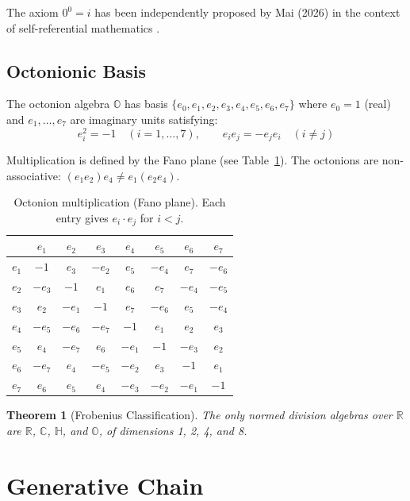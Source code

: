 \documentclass[11pt]{article}
\newtheorem{theorem}{Theorem}
\begin{document}
The axiom $0^0 = i$ has been independently proposed by Mai (2026) in the context of self-referential mathematics \cite{mai2026selfreferential}.

\subsection{Octonionic Basis}

The octonion algebra $\mathbb{O}$ has basis $\{e_0, e_1, e_2, e_3, e_4, e_5, e_6, e_7\}$ where $e_0 = 1$ (real) and $e_1, \ldots, e_7$ are imaginary units satisfying:
\begin{equation}
e_i^2 = -1 \quad (i = 1, \ldots, 7), \qquad e_i e_j = -e_j e_i \quad (i \neq j)
\end{equation}

Multiplication is defined by the Fano plane (see Table~\ref{tab:fano}). The octonions are non-associative: $(e_1 e_2) e_4 \neq e_1 (e_2 e_4)$.

\begin{table}[ht]
\centering
\caption{Octonion multiplication (Fano plane). Each entry gives $e_i \cdot e_j$ for $i < j$.}
\label{tab:fano}
\begin{tabular}{c|ccccccc}
\toprule
 & $e_1$ & $e_2$ & $e_3$ & $e_4$ & $e_5$ & $e_6$ & $e_7$ \\
\midrule
$e_1$ & $-1$ & $e_3$ & $-e_2$ & $e_5$ & $-e_4$ & $e_7$ & $-e_6$ \\
$e_2$ & $-e_3$ & $-1$ & $e_1$ & $e_6$ & $e_7$ & $-e_4$ & $-e_5$ \\
$e_3$ & $e_2$ & $-e_1$ & $-1$ & $e_7$ & $-e_6$ & $e_5$ & $-e_4$ \\
$e_4$ & $-e_5$ & $-e_6$ & $-e_7$ & $-1$ & $e_1$ & $e_2$ & $e_3$ \\
$e_5$ & $e_4$ & $-e_7$ & $e_6$ & $-e_1$ & $-1$ & $-e_3$ & $e_2$ \\
$e_6$ & $-e_7$ & $e_4$ & $-e_5$ & $-e_2$ & $e_3$ & $-1$ & $e_1$ \\
$e_7$ & $e_6$ & $e_5$ & $e_4$ & $-e_3$ & $-e_2$ & $-e_1$ & $-1$ \\
\bottomrule
\end{tabular}
\end{table}

\begin{theorem}[Frobenius Classification]
The only normed division algebras over $\mathbb{R}$ are $\mathbb{R}$, $\mathbb{C}$, $\mathbb{H}$, and $\mathbb{O}$, of dimensions 1, 2, 4, and 8.
\end{theorem}

\section{Generative Chain}
\end{document}
